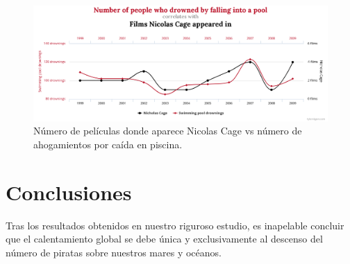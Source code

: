 \documentclass{article}
\begin{document}
\begin{figure}
  \includegraphics[width=\linewidth]{graph_2.png}
  \caption{Número de películas donde aparece Nicolas Cage vs número de ahogamientos por caída en piscina.}
  \label{fig:grafico_2}
\end{figure}




\section{Conclusiones}

Tras los resultados obtenidos en nuestro riguroso estudio, es inapelable concluir que el calentamiento global se debe única y exclusivamente al descenso del número de piratas sobre nuestros mares y océanos.




{}

\end{document}
